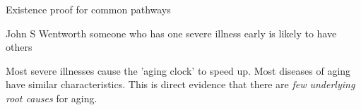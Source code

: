 \begin{frame}[c]{Existence proof for common pathways}
    \large
    \begin{aquote}{John S Wentworth}
        someone who has one severe illness early is likely to have others
    \end{aquote}

    \pause
    Most severe illnesses cause the 'aging clock' to speed up. Most diseases of
    aging have similar characteristics. This is direct evidence that there are
    {\em few underlying root causes} for aging.
\end{frame}
